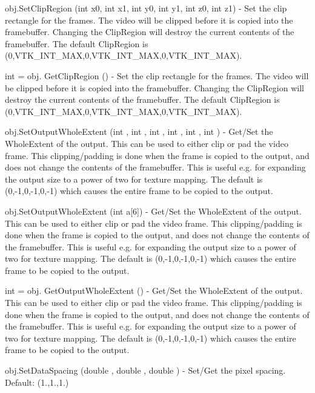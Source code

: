 \begin{DoxyItemize}
\item {\ttfamily obj.\-Set\-Clip\-Region (int x0, int x1, int y0, int y1, int z0, int z1)} -\/ Set the clip rectangle for the frames. The video will be clipped before it is copied into the framebuffer. Changing the Clip\-Region will destroy the current contents of the framebuffer. The default Clip\-Region is (0,V\-T\-K\-\_\-\-I\-N\-T\-\_\-\-M\-A\-X,0,V\-T\-K\-\_\-\-I\-N\-T\-\_\-\-M\-A\-X,0,V\-T\-K\-\_\-\-I\-N\-T\-\_\-\-M\-A\-X).  
\item {\ttfamily int = obj. Get\-Clip\-Region ()} -\/ Set the clip rectangle for the frames. The video will be clipped before it is copied into the framebuffer. Changing the Clip\-Region will destroy the current contents of the framebuffer. The default Clip\-Region is (0,V\-T\-K\-\_\-\-I\-N\-T\-\_\-\-M\-A\-X,0,V\-T\-K\-\_\-\-I\-N\-T\-\_\-\-M\-A\-X,0,V\-T\-K\-\_\-\-I\-N\-T\-\_\-\-M\-A\-X).  
\item {\ttfamily obj.\-Set\-Output\-Whole\-Extent (int , int , int , int , int , int )} -\/ Get/\-Set the Whole\-Extent of the output. This can be used to either clip or pad the video frame. This clipping/padding is done when the frame is copied to the output, and does not change the contents of the framebuffer. This is useful e.\-g. for expanding the output size to a power of two for texture mapping. The default is (0,-\/1,0,-\/1,0,-\/1) which causes the entire frame to be copied to the output.  
\item {\ttfamily obj.\-Set\-Output\-Whole\-Extent (int a\mbox{[}6\mbox{]})} -\/ Get/\-Set the Whole\-Extent of the output. This can be used to either clip or pad the video frame. This clipping/padding is done when the frame is copied to the output, and does not change the contents of the framebuffer. This is useful e.\-g. for expanding the output size to a power of two for texture mapping. The default is (0,-\/1,0,-\/1,0,-\/1) which causes the entire frame to be copied to the output.  
\item {\ttfamily int = obj. Get\-Output\-Whole\-Extent ()} -\/ Get/\-Set the Whole\-Extent of the output. This can be used to either clip or pad the video frame. This clipping/padding is done when the frame is copied to the output, and does not change the contents of the framebuffer. This is useful e.\-g. for expanding the output size to a power of two for texture mapping. The default is (0,-\/1,0,-\/1,0,-\/1) which causes the entire frame to be copied to the output.  
\item {\ttfamily obj.\-Set\-Data\-Spacing (double , double , double )} -\/ Set/\-Get the pixel spacing. Default\-: (1.,1.,1.)  

\end{DoxyItemize}
